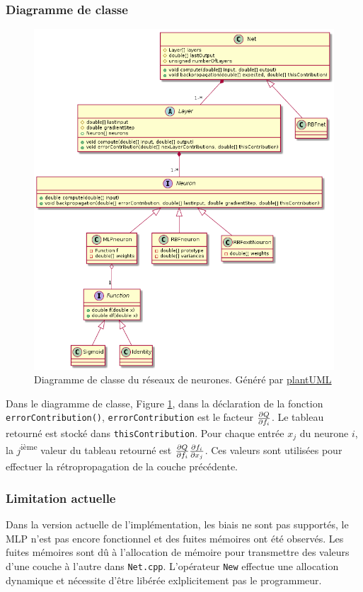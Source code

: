 \documentclass[12pt,a4paper,oneside, titlepage]{article}
\begin{document}
\subsubsection{Diagramme de classe}
\begin{figure}
 \centering
 \includegraphics[width=\textwidth]{../../uml/neurondiag.png}
 \caption{Diagramme de classe du réseaux de neurones. \footnotesize Généré par \href{http://plantuml.com/class-diagram}{plantUML}}
 \label{fig:diagclasse}
\end{figure}
Dans le diagramme de classe, Figure \ref{fig:diagclasse}, dans la déclaration de la fonction \texttt{errorContribution()}, \texttt{errorContribution} est le facteur $\frac{\partial Q}{\partial f_i}$.
Le tableau retourné est stocké dans \texttt{thisContribution}.
Pour chaque entrée $x_j$ du neurone $i$, la $j$\textsuperscript{ième} valeur du tableau retourné est $\frac{\partial Q}{\partial f_i}\frac{\partial f_i}{\partial x_j}$.
Ces valeurs sont utilisées pour effectuer la rétropropagation de la couche précédente.

\subsubsection{Limitation actuelle}
Dans la version actuelle de l'implémentation, les biais ne sont pas supportés, le MLP n'est pas encore fonctionnel et des fuites mémoires ont été observés.
Les fuites mémoires sont dû à l'allocation de mémoire pour transmettre des valeurs d'une couche à l'autre dans \texttt{Net.cpp}.
L'opérateur \texttt{New} effectue une allocation dynamique et nécessite d'être libérée exlplicitement pas le programmeur.
\end{document}
